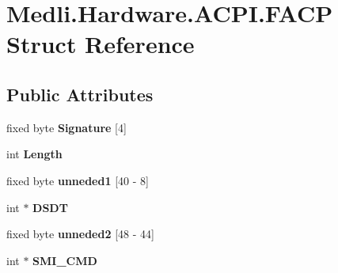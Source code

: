 \hypertarget{struct_medli_1_1_hardware_1_1_a_c_p_i_1_1_f_a_c_p}{}\section{Medli.\+Hardware.\+A\+C\+P\+I.\+F\+A\+CP Struct Reference}
\label{struct_medli_1_1_hardware_1_1_a_c_p_i_1_1_f_a_c_p}
\subsection*{Public Attributes}
\begin{DoxyCompactItemize}
\item 
\mbox{\label{struct_medli_1_1_hardware_1_1_a_c_p_i_1_1_f_a_c_p_ab118b6ea132fb5d253036f69ec219e8f}} 
fixed byte {\bfseries Signature} \mbox{[}4\mbox{]}
\item 
\mbox{\label{struct_medli_1_1_hardware_1_1_a_c_p_i_1_1_f_a_c_p_a9a311c82c17bfce792f666aed056ce2e}} 
int {\bfseries Length}
\item 
\mbox{\label{struct_medli_1_1_hardware_1_1_a_c_p_i_1_1_f_a_c_p_acfbd76f608b410a137d23512289c8a7e}} 
fixed byte {\bfseries unneded1} \mbox{[}40 -\/ 8\mbox{]}
\item 
\mbox{\label{struct_medli_1_1_hardware_1_1_a_c_p_i_1_1_f_a_c_p_a31dee55f6fd0a8d27759c414394cb50c}} 
int $\ast$ {\bfseries D\+S\+DT}
\item 
\mbox{\label{struct_medli_1_1_hardware_1_1_a_c_p_i_1_1_f_a_c_p_afa73ce953ac1038f81197426897b9fef}} 
fixed byte {\bfseries unneded2} \mbox{[}48 -\/ 44\mbox{]}
\item 
\mbox{\label{struct_medli_1_1_hardware_1_1_a_c_p_i_1_1_f_a_c_p_ab85aadcfcf2dc4ddbf83e497f6912f42}} 
int $\ast$ {\bfseries S\+M\+I\+\_\+\+C\+MD}
\item 
\mbox{\label{struct_medli_1_1_hardware_1_1_a_c_p_i_1_1_f_a_c_p_a7fcc8d534b96805c8ae8c865177c81c6}} 

\end{DoxyCompactItemize}
